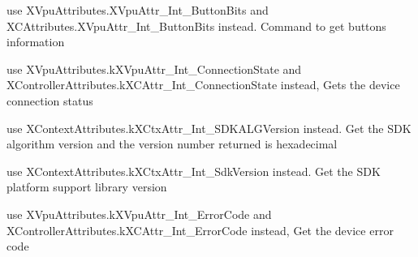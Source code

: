 \begin{DoxyRefList}
\item[\label{deprecated__deprecated000029}%
\Hypertarget{deprecated__deprecated000029}%
Member \mbox{\hyperlink{class_ximmerse_1_1_input_system_1_1_x_device_plugin_ab7f817a86e5b3af956089fb089b7d0c3a600d9ed92cf7f133e59cf0f1632a191e}{Ximmerse.Input\+System.X\+Device\+Plugin.k\+X\+Act\+\_\+\+Get\+Int\+\_\+\+Button\+Bits}} ]use X\+Vpu\+Attributes.\+X\+Vpu\+Attr\+\_\+\+Int\+\_\+\+Button\+Bits and X\+C\+Attributes.\+X\+Vpu\+Attr\+\_\+\+Int\+\_\+\+Button\+Bits instead. Command to get buttons information  
\item[\label{deprecated__deprecated000009}%
\Hypertarget{deprecated__deprecated000009}%
Member \mbox{\hyperlink{class_ximmerse_1_1_input_system_1_1_x_device_plugin_ab7f817a86e5b3af956089fb089b7d0c3a07c0c5dfc2f415fbdaf171e7ca35945a}{Ximmerse.Input\+System.X\+Device\+Plugin.k\+X\+Act\+\_\+\+Get\+Int\+\_\+\+Connection\+State}} ]use X\+Vpu\+Attributes.\+k\+X\+Vpu\+Attr\+\_\+\+Int\+\_\+\+Connection\+State and X\+Controller\+Attributes.\+k\+X\+C\+Attr\+\_\+\+Int\+\_\+\+Connection\+State instead, Gets the device connection status  
\item[\label{deprecated__deprecated000006}%
\Hypertarget{deprecated__deprecated000006}%
Member \mbox{\hyperlink{class_ximmerse_1_1_input_system_1_1_x_device_plugin_ab7f817a86e5b3af956089fb089b7d0c3a841d848bf84742884ef91b5f5b1de65a}{Ximmerse.Input\+System.X\+Device\+Plugin.k\+X\+Act\+\_\+\+Get\+Int\+\_\+\+Ctx\+S\+D\+K\+A\+L\+G\+Version}} ]use X\+Context\+Attributes.\+k\+X\+Ctx\+Attr\+\_\+\+Int\+\_\+\+S\+D\+K\+A\+L\+G\+Version instead. Get the S\+DK algorithm version and the version number returned is hexadecimal  
\item[\label{deprecated__deprecated000005}%
\Hypertarget{deprecated__deprecated000005}%
Member \mbox{\hyperlink{class_ximmerse_1_1_input_system_1_1_x_device_plugin_ab7f817a86e5b3af956089fb089b7d0c3a696f9eee8ccd720795fed59db1fc5c34}{Ximmerse.Input\+System.X\+Device\+Plugin.k\+X\+Act\+\_\+\+Get\+Int\+\_\+\+Ctx\+Sdk\+Version}} ]use X\+Context\+Attributes.\+k\+X\+Ctx\+Attr\+\_\+\+Int\+\_\+\+Sdk\+Version instead. Get the S\+DK platform support library version  
\item[\label{deprecated__deprecated000008}%
\Hypertarget{deprecated__deprecated000008}%
Member \mbox{\hyperlink{class_ximmerse_1_1_input_system_1_1_x_device_plugin_ab7f817a86e5b3af956089fb089b7d0c3a70a9d909ec4d215aa2266baaf7e816aa}{Ximmerse.Input\+System.X\+Device\+Plugin.k\+X\+Act\+\_\+\+Get\+Int\+\_\+\+Error\+Code}} ]use X\+Vpu\+Attributes.\+k\+X\+Vpu\+Attr\+\_\+\+Int\+\_\+\+Error\+Code and X\+Controller\+Attributes.\+k\+X\+C\+Attr\+\_\+\+Int\+\_\+\+Error\+Code instead, Get the device error code  

\end{DoxyRefList}
